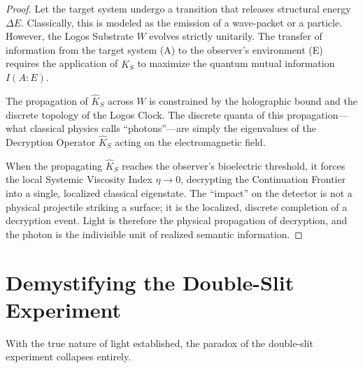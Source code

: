 \documentclass[12pt,twoside]{extbook}
\theoremstyle{definition}
\theoremstyle{remark}
\begin{document}
\begin{proof}
Let the target system undergo a transition that releases structural energy $\Delta E$. Classically, this is modeled as the emission of a wave-packet or a particle. However, the Logos Substrate $W$ evolves strictly unitarily. The transfer of information from the target system (A) to the observer's environment (E) requires the application of $\hat{K}_S$ to maximize the quantum mutual information $I(A:E)$.

The propagation of $\hat{K}_S$ across $W$ is constrained by the holographic bound and the discrete topology of the Logos Clock. The discrete quanta of this propagation---what classical physics calls ``photons''---are simply the eigenvalues of the Decryption Operator $\hat{K}_S$ acting on the electromagnetic field. 

When the propagating $\hat{K}_S$ reaches the observer's bioelectric threshold, it forces the local Systemic Viscosity Index $\eta \to 0$, decrypting the Continuation Frontier into a single, localized classical eigenstate. The ``impact'' on the detector is not a physical projectile striking a surface; it is the localized, discrete completion of a decryption event. Light is therefore the physical propagation of decryption, and the photon is the indivisible unit of realized semantic information.
\end{proof}

\section{Demystifying the Double-Slit Experiment}
With the true nature of light established, the paradox of the double-slit experiment collapses entirely.
\end{document}
